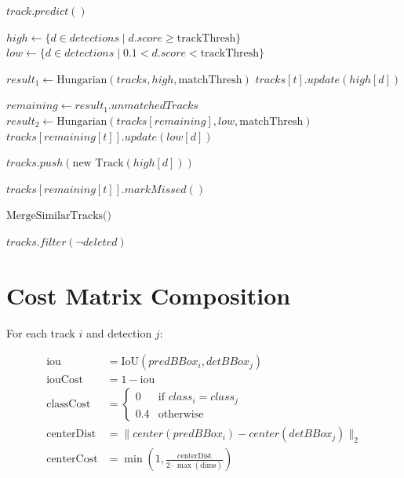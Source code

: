 \begin{algorithm}
\caption{ByteTrack++ Update (Per Frame)}
\begin{algorithmic}
 
    \State $track.predict()$
\EndFor

\State $high \gets \{d \in detections \mid d.score \ge \text{trackThresh}\}$
\State $low \gets \{d \in detections \mid 0.1 < d.score < \text{trackThresh}\}$

\State $result_1 \gets \text{Hungarian}(tracks, high, \text{matchThresh})$
    \State $tracks[t].update(high[d])$
\EndFor

\State $remaining \gets result_1.unmatchedTracks$
\State $result_2 \gets \text{Hungarian}(tracks[remaining], low, \text{matchThresh})$
    \State $tracks[remaining[t]].update(low[d])$
\EndFor

    \State $tracks.push(\text{new Track}(high[d]))$
\EndFor

    \State $tracks[remaining[t]].markMissed()$
\EndFor

\State $\text{MergeSimilarTracks()}$ 

\State \Return $tracks.filter(\neg deleted)$
\EndProcedure
\end{algorithmic}
\end{algorithm}

\section{Cost Matrix Composition}
\label{sec:cost-matrix-detail}

For each track $i$ and detection $j$:

\begin{align}
\text{iou} &= \text{IoU}(predBBox_i, detBBox_j) \\
\text{iouCost} &= 1 - \text{iou} \\
\text{classCost} &= \begin{cases} 0 & \text{if } class_i = class_j \\ 0.4 & \text{otherwise} \end{cases} \\
\text{centerDist} &= \| center(predBBox_i) - center(detBBox_j) \|_2 \\
\text{centerCost} &= \min\left(1, \frac{\text{centerDist}}{2 \cdot \max(\text{dims})}\right)
\end{align}

